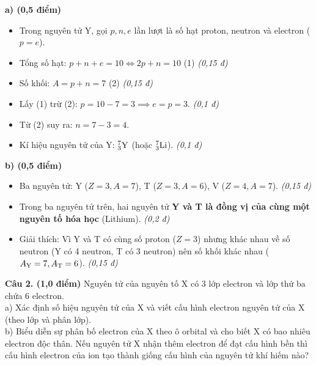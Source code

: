 \documentclass[11pt,a4paper]{article}
\begin{document}
\begin{tcolorbox}[colback=white,colframe=solBlue,title=\textbf{Hướng dẫn giải chi tiết Câu 1 (1,0 điểm):}]
\textbf{a) (0,5 điểm)}
\begin{itemize}[leftmargin=1.0cm]
\item Trong nguyên tử Y, gọi $p, n, e$ lần lượt là số hạt proton, neutron và electron ($p = e$).
\item Tổng số hạt: $p + n + e = 10 \iff 2p + n = 10$ \quad (1) \hfill \textit{(0,15 đ)}
\item Số khối: $A = p + n = 7$ \quad (2) \hfill \textit{(0,15 đ)}
\item Lấy (1) trừ (2): $p = 10 - 7 = 3 \implies e = p = 3$. \hfill \textit{(0,1 đ)}
\item Từ (2) suy ra: $n = 7 - 3 = 4$.
\item Kí hiệu nguyên tử của Y: $^{7}_{3}\ce{Y}$ (hoặc $^{7}_{3}\ce{Li}$). \hfill \textit{(0,1 đ)}
\end{itemize}
\textbf{b) (0,5 điểm)}
\begin{itemize}[leftmargin=1.0cm]
\item Ba nguyên tử: Y ($Z = 3, A = 7$), T ($Z = 3, A = 6$), V ($Z = 4, A = 7$). \hfill \textit{(0,15 đ)}
\item Trong ba nguyên tử trên, hai nguyên tử \textbf{Y và T là đồng vị của cùng một nguyên tố hóa học} (Lithium). \hfill \textit{(0,2 đ)}
\item Giải thích: Vì Y và T có cùng số proton ($Z = 3$) nhưng khác nhau về số neutron (Y có 4 neutron, T có 3 neutron) nên số khối khác nhau ($A_{\ce{Y}} = 7, A_{\ce{T}} = 6$). \hfill \textit{(0,15 đ)}
\end{itemize}
\end{tcolorbox}

\vspace{4pt}
\noindent
\textbf{Câu 2. (1,0 điểm)} Nguyên tử của nguyên tố X có 3 lớp electron và lớp thứ ba chứa 6 electron.\\
a) Xác định số hiệu nguyên tử của X và viết cấu hình electron nguyên tử của X (theo lớp và phân lớp).\\
b) Biểu diễn sự phân bố electron của X theo ô orbital và cho biết X có bao nhiêu electron độc thân. Nếu nguyên tử X nhận thêm electron để đạt cấu hình bền thì cấu hình electron của ion tạo thành giống cấu hình của nguyên tử khí hiếm nào?
\end{document}
